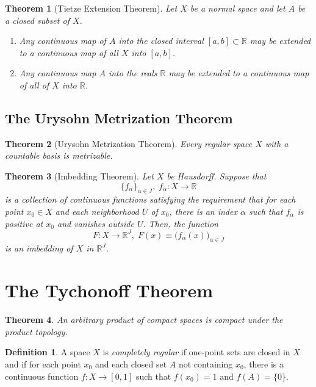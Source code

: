 \documentclass{article}
\newtheorem{theorem}{Theorem}[section]
\theoremstyle{remark}
\theoremstyle{definition}
\newtheorem{definition}{Definition}[section]
\begin{document}
\begin{theorem}[Tietze Extension Theorem]
Let $X$ be a normal space and let $A$ be a closed subset of $X$. 
\begin{enumerate}
    \item Any continuous map of $A$ into the closed interval $[a,b] \subset \mathbb{R}$ may be extended to a continuous map of all $X$ into $[a,b]$. 
    \item Any continuous map $A$ into the reals $\mathbb{R}$ may be extended to a continuous map of all of $X$ into $\mathbb{R}$. 
\end{enumerate}
\end{theorem}

\subsection{The Urysohn Metrization Theorem}
\begin{theorem}[Urysohn Metrization Theorem]
Every regular space $X$ with a countable basis is metrizable. 
\end{theorem}

\begin{theorem}[Imbedding Theorem]
Let $X$ be Hausdorff. Suppose that 
\[\{f_\alpha\}_{\alpha \in J}, \; f_\alpha: X \longrightarrow \mathbb{R}\]
is a collection of continuous functions satisfying the requirement that for each point $x_0 \in X$ and each neighborhood $U$ of $x_0$, there is an index $\alpha$ such that $f_\alpha$ is positive at $x_0$ and vanishes outside $U$. Then, the function 
\[F: X \longrightarrow \mathbb{R}^J, \; F(x) \equiv \big( f_\alpha (x)\big)_{\alpha \in J}\]
is an \textit{imbedding} of $X$ in $\mathbb{R}^J$.
\end{theorem}

\section{The Tychonoff Theorem}
\begin{theorem}
An arbitrary product of compact spaces is compact under the product topology. 
\end{theorem}

\begin{definition}
A space $X$ is \textit{completely regular} if one-point sets are closed in $X$ and if for each point $x_0$ and each closed set $A$ not containing $x_0$, there is a continuous function $f: X \longrightarrow [0,1]$ such that $f(x_0) = 1$ and $f(A) = \{0\}$. 
\end{definition}
\end{document}
